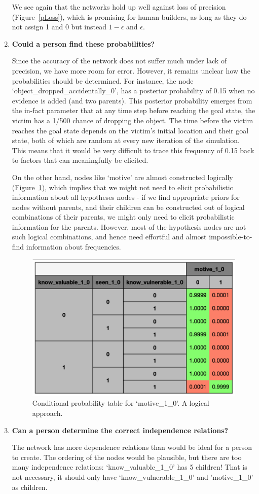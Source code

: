 \begin{enumerate}
We see again that the networks hold up well against loss of precision (Figure~\ref{pLoss}), which is promising for human builders, as long as they do not assign 1 and 0 but instead $1 - \epsilon$ and $\epsilon$.

\item \textbf{Could a person find these probabilities?}

Since the accuracy of the network does not suffer much under lack of precision, we have more room for error. However, it remains unclear how the probabilities should be determined. For instance, the node `object\_dropped\_accidentally\_0', has a posterior probability of 0.15 when no evidence is added (and two parents). This posterior probability emerges from the in-fact parameter that at any time step before reaching the goal state, the victim has a 1/500 chance of dropping the object. The time before the victim reaches the goal state depends on the victim's initial location and their goal state, both of which are random at every new iteration of the simulation. This means that it would be very difficult to trace this frequency of 0.15 back to factors that can meaningfully be elicited.

On the other hand, nodes like `motive' are almost constructed logically (Figure~\ref{cptmotive}), which implies that we might not need to elicit probabilistic information about all hypotheses nodes - if we find appropriate priors for nodes without parents, and their children can be constructed out of logical combinations of their parents, we might only need to elicit probabilistic information for the parents. However, most of the hypothesis nodes are not such logical combinations, and hence need effortful and almost impossible-to-find information about frequencies.

\begin{figure}[htbp]
 \centering
 \includegraphics[width=0.6\linewidth]{images/cptMotive.png}
\caption{ Conditional probability table for `motive\_1\_0'. A logical approach.}
\label{cptmotive}
\end{figure}%

\item \textbf{Can a person determine the correct independence relations?}

The network has more dependence relations than would be ideal for a person to create. The ordering of the nodes would be plausible, but there are too many independence relations: `know\_valuable\_1\_0' has 5 children! That is not necessary, it should only have `know\_vulnerable\_1\_0' and 'motive\_1\_0' as children.

\end{enumerate}


